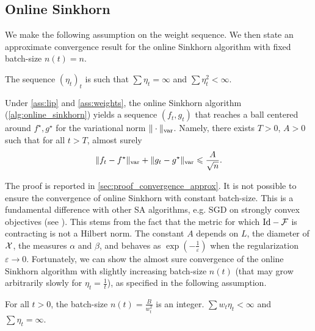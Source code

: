 \subsection{Online Sinkhorn}

We make the following \citet{robbins1951stochastic} assumption on the weight sequence. We then state an approximate convergence result for the online Sinkhorn algorithm with fixed batch-size $n(t) = n$.

\begin{assumption}\label{ass:weights}
    The sequence ${(\eta_t)}_t$ is such that
    $\sum \eta_t = \infty$ and $\sum \eta_t^2 < \infty$.
\end{assumption}

\begin{proposition}\label{prop:convergence_approx}
    Under \autoref{ass:lip} and \ref{ass:weights}, the online Sinkhorn algorithm (\autoref{alg:online_sinkhorn}) yields a sequence $(f_t, g_t)$ that reaches a
    ball centered around $f^\star, g^\star$ for the variational norm $\Vert
    \cdot \Vert_{\text{\upshape var}}$.
     Namely, there exists $T > 0$, $A > 0$ such that for all $t > T$, almost surely
    \begin{equation}
        \Vert f_t - f^\star \Vert_{\text{\upshape var}}
        + \Vert g_t - g^\star \Vert_{\text{\upshape var}} 
        \leqslant \frac{A}{\sqrt{n}} .
    \end{equation}
\end{proposition}

The proof is reported in \autoref{sec:proof_convergence_approx}. It is not possible
to ensure the convergence of online Sinkhorn with constant batch-size. This is a
fundamental difference with other SA algorithms, e.g. SGD on strongly convex
objectives (see \cite{moulines_non-asymptotic_2011}). This stems from the fact
that the metric for which $\text{Id} - \mathcal{F}$ is contracting is
not a Hilbert norm. The constant $A$ depends on $L$, the diameter of $\mathcal{X}$, the measures $\alpha$ and
$\beta$, and behaves as $\exp(-\frac{1}{\varepsilon})$ when the
regularization $\varepsilon \to 0$.
Fortunately, we can show the almost sure convergence of the online Sinkhorn algorithm
with slightly increasing batch-size $n(t)$ (that may grow arbitrarily slowly for $\eta_t = \frac{1}{t}$), as specified in the following
assumption.

\begin{assumption}\label{ass:double_weights}
    For all $t > 0$, the batch-size $n(t) = \frac{B}{w_t^2}$ is an integer. $\sum w_t \eta_t <
    \infty$ and $\sum \eta_t = \infty$.
\end{assumption}

